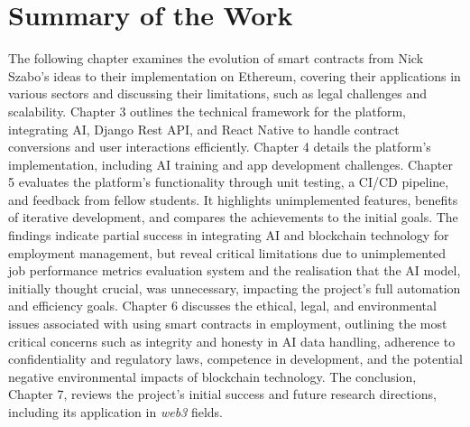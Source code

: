 \section{Summary of the Work}

The following chapter examines the evolution of smart contracts from Nick Szabo's ideas to their implementation on Ethereum, covering their applications in various sectors and discussing their limitations, such as legal challenges and scalability. Chapter 3 outlines the technical framework for the platform, integrating AI, Django Rest API, and React Native to handle contract conversions and user interactions efficiently. Chapter 4 details the platform's implementation, including AI training and app development challenges. Chapter 5 evaluates the platform's functionality through unit testing, a CI/CD pipeline, and feedback from fellow students. It highlights unimplemented features, benefits of iterative development, and compares the achievements to the initial goals. The findings indicate partial success in integrating AI and blockchain technology for employment management, but reveal critical limitations due to unimplemented job performance metrics evaluation system and the realisation that the AI model, initially thought crucial, was unnecessary, impacting the project's full automation and efficiency goals. Chapter 6 discusses the ethical, legal, and environmental issues associated with using smart contracts in employment, outlining the most critical concerns such as integrity and honesty in AI data handling, adherence to confidentiality and regulatory laws, competence in development, and the potential negative environmental impacts of blockchain technology. The conclusion, Chapter 7, reviews the project's initial success and future research directions, including its application in \textit{web3} fields.
